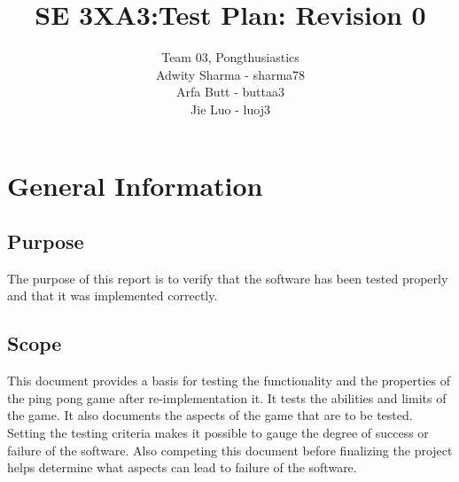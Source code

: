 \documentclass[12pt,letterpaper]{article}
\title{SE 3XA3:Test Plan: Revision 0}
\author{Team 03, Pongthusiastics 		
\\ Adwity Sharma - sharma78 		
\\ Arfa Butt - buttaa3 	
	\\ Jie Luo - luoj3 }
\date{}
\begin{document}
\maketitle
\newpage
\tableofcontents
\newpage
	
	\section{General Information}
	\subsection{Purpose}
	The purpose of this report is to verify that the software has been tested properly and that it was implemented correctly.
	
	\subsection{Scope}
	This document provides a basis for testing the functionality and the properties of the ping pong game after re-implementation it. It tests the abilities and limits of the game. It also documents the aspects of the game that are to be tested. Setting the testing criteria makes it possible to gauge the degree of success or failure of the software. Also competing this document before finalizing the project helps determine what aspects can lead to failure of the software.
	
\end{document}
